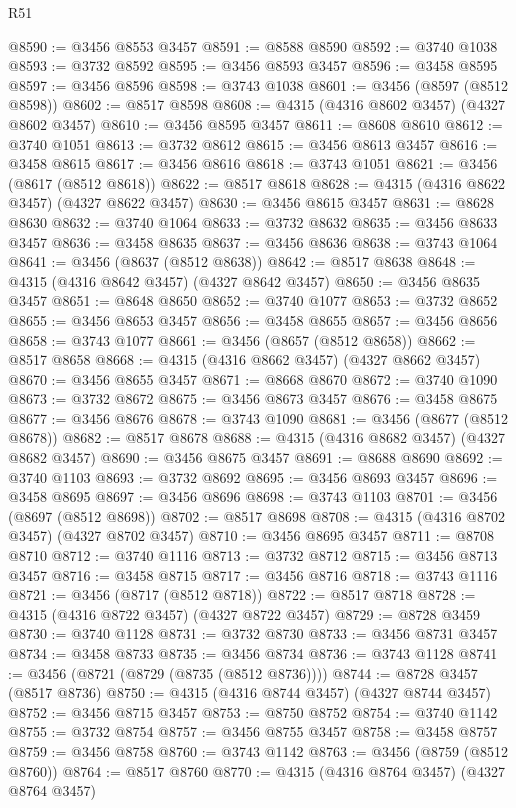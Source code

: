 \begin{lexlean}{R51}
\begin{coremodule}
@8590 := @3456 @8553 @3457
@8591 := @8588 @8590
@8592 := @3740 @1038
@8593 := @3732 @8592
@8595 := @3456 @8593 @3457
@8596 := @3458 @8595
@8597 := @3456 @8596
@8598 := @3743 @1038
@8601 := @3456 (@8597 (@8512 @8598))
@8602 := @8517 @8598
@8608 := @4315 (@4316 @8602 @3457) (@4327 @8602 @3457)
@8610 := @3456 @8595 @3457
@8611 := @8608 @8610
@8612 := @3740 @1051
@8613 := @3732 @8612
@8615 := @3456 @8613 @3457
@8616 := @3458 @8615
@8617 := @3456 @8616
@8618 := @3743 @1051
@8621 := @3456 (@8617 (@8512 @8618))
@8622 := @8517 @8618
@8628 := @4315 (@4316 @8622 @3457) (@4327 @8622 @3457)
@8630 := @3456 @8615 @3457
@8631 := @8628 @8630
@8632 := @3740 @1064
@8633 := @3732 @8632
@8635 := @3456 @8633 @3457
@8636 := @3458 @8635
@8637 := @3456 @8636
@8638 := @3743 @1064
@8641 := @3456 (@8637 (@8512 @8638))
@8642 := @8517 @8638
@8648 := @4315 (@4316 @8642 @3457) (@4327 @8642 @3457)
@8650 := @3456 @8635 @3457
@8651 := @8648 @8650
@8652 := @3740 @1077
@8653 := @3732 @8652
@8655 := @3456 @8653 @3457
@8656 := @3458 @8655
@8657 := @3456 @8656
@8658 := @3743 @1077
@8661 := @3456 (@8657 (@8512 @8658))
@8662 := @8517 @8658
@8668 := @4315 (@4316 @8662 @3457) (@4327 @8662 @3457)
@8670 := @3456 @8655 @3457
@8671 := @8668 @8670
@8672 := @3740 @1090
@8673 := @3732 @8672
@8675 := @3456 @8673 @3457
@8676 := @3458 @8675
@8677 := @3456 @8676
@8678 := @3743 @1090
@8681 := @3456 (@8677 (@8512 @8678))
@8682 := @8517 @8678
@8688 := @4315 (@4316 @8682 @3457) (@4327 @8682 @3457)
@8690 := @3456 @8675 @3457
@8691 := @8688 @8690
@8692 := @3740 @1103
@8693 := @3732 @8692
@8695 := @3456 @8693 @3457
@8696 := @3458 @8695
@8697 := @3456 @8696
@8698 := @3743 @1103
@8701 := @3456 (@8697 (@8512 @8698))
@8702 := @8517 @8698
@8708 := @4315 (@4316 @8702 @3457) (@4327 @8702 @3457)
@8710 := @3456 @8695 @3457
@8711 := @8708 @8710
@8712 := @3740 @1116
@8713 := @3732 @8712
@8715 := @3456 @8713 @3457
@8716 := @3458 @8715
@8717 := @3456 @8716
@8718 := @3743 @1116
@8721 := @3456 (@8717 (@8512 @8718))
@8722 := @8517 @8718
@8728 := @4315 (@4316 @8722 @3457) (@4327 @8722 @3457)
@8729 := @8728 @3459
@8730 := @3740 @1128
@8731 := @3732 @8730
@8733 := @3456 @8731 @3457
@8734 := @3458 @8733
@8735 := @3456 @8734
@8736 := @3743 @1128
@8741 := @3456 (@8721 (@8729 (@8735 (@8512 @8736))))
@8744 := @8728 @3457 (@8517 @8736)
@8750 := @4315 (@4316 @8744 @3457) (@4327 @8744 @3457)
@8752 := @3456 @8715 @3457
@8753 := @8750 @8752
@8754 := @3740 @1142
@8755 := @3732 @8754
@8757 := @3456 @8755 @3457
@8758 := @3458 @8757
@8759 := @3456 @8758
@8760 := @3743 @1142
@8763 := @3456 (@8759 (@8512 @8760))
@8764 := @8517 @8760
@8770 := @4315 (@4316 @8764 @3457) (@4327 @8764 @3457)

\end{coremodule}
\end{lexlean}
